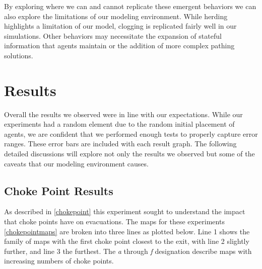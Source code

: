 \documentclass[12pt,letterpaper]{article}
\begin{document}
By exploring where we can and cannot replicate these emergent behaviors we can also explore the limitations of our modeling environment.  While herding highlights a limitation of our model, clogging is replicated fairly well in our simulations.  Other behaviors may necessitate the expansion of stateful information that agents maintain or the addition of more complex pathing solutions. 

\section{Results}
Overall the results we observed were in line with our expectations.  While our experiments had a random element due to the random initial placement of agents, we are confident that we performed enough tests to properly capture error ranges.  These error bars are included with each result graph.  The following detailed discussions will explore not only the results we observed but some of the caveats that our modeling environment causes.

%

\subsection{Choke Point Results}

As described in \ref{chokepoint} this experiment sought to understand the impact that choke points have on evacuations. The maps for these experiments \ref{chokepointmaps} are broken into three lines as plotted below.  Line 1 shows the family of maps with the first choke point closest to the exit, with line 2 slightly further, and line 3 the furthest.  The \emph{a} through \emph{f} designation describe maps with increasing numbers of choke points. 
\end{document}
